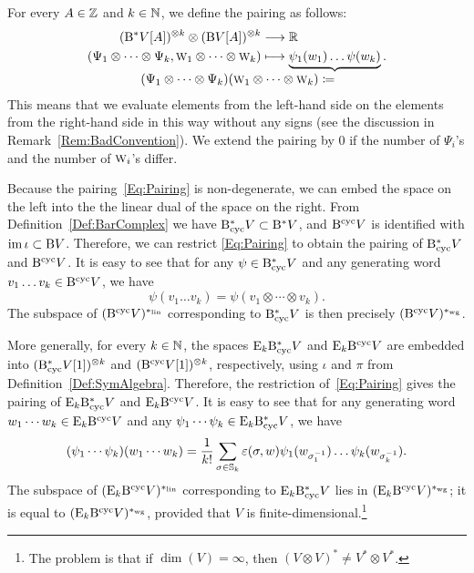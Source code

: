 \documentclass[\MainFolder/Text.tex]{subfiles}
\begin{document}
\begin{Definition}\label{Def:Pairings}
For every $A\in \mathbb{Z}$ and  $k\in \mathbb{N}$, we define the pairing as follows:
\begin{equation} \label{Eq:Pairing}
\begin{aligned}
(\DB V[A])^{\otimes k} \otimes (\B V[A])^{\otimes k} & \longrightarrow \R \\ 
(\Psi_1 \otimes \dotsb \otimes \Psi_k, \W_1 \otimes \dotsb \otimes \W_k) & \longmapsto \underbrace{\psi_1(w_1) \dots \psi(w_k)}_{\mathllap{\textstyle{(\Psi_1 \otimes \dotsb \otimes \Psi_k)(\W_1\otimes \dotsb\otimes \W_k)\coloneqq}}}.
\end{aligned}
\end{equation}
This means that we evaluate elements from the left-hand side on the elements from the right-hand side in this way without any signs (see the discussion in Remark~\ref{Rem:BadConvention}). We extend the pairing by $0$ if the number of $\Psi_i$'s and the number of $\text{\footnotesize W}_i$'s differ.
\end{Definition}

\begin{Remark} \label{Rem:Identifications}
Because the pairing~\eqref{Eq:Pairing} is non-degenerate, we can embed the space on the left into the the linear dual of the space on the right.
From Definition~\ref{Def:BarComplex} we have $\mathrm{B}_{\mathrm{cyc}}^* V \subset \mathrm{B}^* V$, and $\mathrm{B}^{\mathrm{cyc}} V$ is identified with $\operatorname{im} \iota \subset \mathrm{B} V$. Therefore, we can restrict \eqref{Eq:Pairing} to obtain the pairing of $\mathrm{B}_{\mathrm{cyc}}^* V$ and $\mathrm{B}^{\mathrm{cyc}} V$. It is easy to see that for any $\psi\in \mathrm{B}_{\mathrm{cyc}}^* V$ and any generating word $v_1\dots v_k \in \mathrm{B}^{\mathrm{cyc}} V$, we have
\begin{equation*}
\psi(v_1\dots v_k) = \psi(v_1 \otimes \dotsb \otimes v_k).
\end{equation*}
The subspace of $(\mathrm{B}^{\mathrm{cyc}} V)^{*_{\mathrm{lin}}}$ corresponding to $\mathrm{B}_{\mathrm{cyc}}^* V$ is then precisely $(\mathrm{B}^{\mathrm{cyc}} V)^{*_{\mathrm{wg}}}$.

More generally, for every $k\in \mathbb{N}$, the spaces $\mathrm{E}_k \mathrm{B}_{\mathrm{cyc}}^* V$ and $\mathrm{E}_k \mathrm{B}^{\mathrm{cyc}} V$ are embedded into $(\mathrm{B}_{\mathrm{cyc}}^* V[1])^{\otimes k}$ and $(\mathrm{B}^{\mathrm{cyc}} V[1])^{\otimes k}$, respectively, using $\iota$ and $\pi$ from Definition~\ref{Def:SymAlgebra}. Therefore, the restriction of~\eqref{Eq:Pairing} gives the pairing of $\mathrm{E}_k \mathrm{B}_{\mathrm{cyc}}^* V$ and $\mathrm{E}_k \mathrm{B}^{\mathrm{cyc}} V$. It is easy to see that for any generating word $w_1\dotsb w_k \in \mathrm{E}_k \mathrm{B}^{\mathrm{cyc}} V$ and any $\psi_1\dotsb \psi_k\in \mathrm{E}_k \mathrm{B}_{\mathrm{cyc}}^* V$, we have
$$ (\psi_1\dotsb \psi_k)(w_1\dotsb w_k) = \frac{1}{k!}\sum_{\sigma\in \mathbb{S}_k} \varepsilon(\sigma,w) \psi_1(w_{\sigma_1^{-1}})\dotsc \psi_k(w_{\sigma_k^{-1}}). $$
The subspace of $(\mathrm{E}_k \mathrm{B}^{\mathrm{cyc}} V)^{*_{\mathrm{lin}}}$ corresponding to $\mathrm{E}_k \mathrm{B}_{\mathrm{cyc}}^* V$  lies in $(\mathrm{E}_k \mathrm{B}^{\mathrm{cyc}} V)^{*_{\mathrm{wg}}}$; it is equal to $(\mathrm{E}_k \mathrm{B}^{\mathrm{cyc}} V)^{*_{\mathrm{wg}}}$, provided that $V$ is finite-dimensional.\footnote{The problem is that if $\dim(V) = \infty$, then $(V\otimes V)^* \neq V^* \otimes V^*$.}
\end{Remark}
\end{document}
